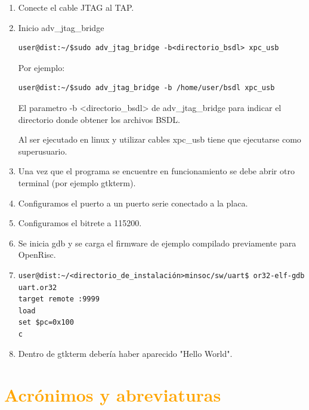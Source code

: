 \begin{enumerate}

\item Conecte el cable JTAG al TAP.
\item Inicio adv\_jtag\_bridge

\begin{lstlisting}[breaklines]
user@dist:~/$sudo adv_jtag_bridge -b<directorio_bsdl> xpc_usb 
\end{lstlisting}

Por ejemplo:

\begin{lstlisting}[breaklines]
user@dist:~/$sudo adv_jtag_bridge -b /home/user/bsdl xpc_usb 
\end{lstlisting}

El parametro -b <directorio\_bsdl> de adv\_jtag\_bridge para indicar el directorio donde obtener los archivos BSDL.

Al ser ejecutado en linux y utilizar cables xpc\_usb tiene que ejecutarse como superusuario.


\item Una vez que el programa se encuentre en funcionamiento se debe abrir otro terminal (por ejemplo gtkterm).
\item Configuramos el puerto a un puerto serie conectado a la placa.
\item Configuramos el bitrete a 115200.

\item Se inicia gdb y se carga el firmware de ejemplo compilado previamente para OpenRisc.

\item 
\begin{lstlisting}[breaklines]
user@dist:~/<directorio_de_instalación>minsoc/sw/uart$ or32-elf-gdb uart.or32
target remote :9999
load
set $pc=0x100
c
\end{lstlisting}

\item Dentro de gtkterm debería haber aparecido "Hello World". 

\end{enumerate}


\newpage

\section{\textcolor{orange}{Acrónimos y abreviaturas}}

